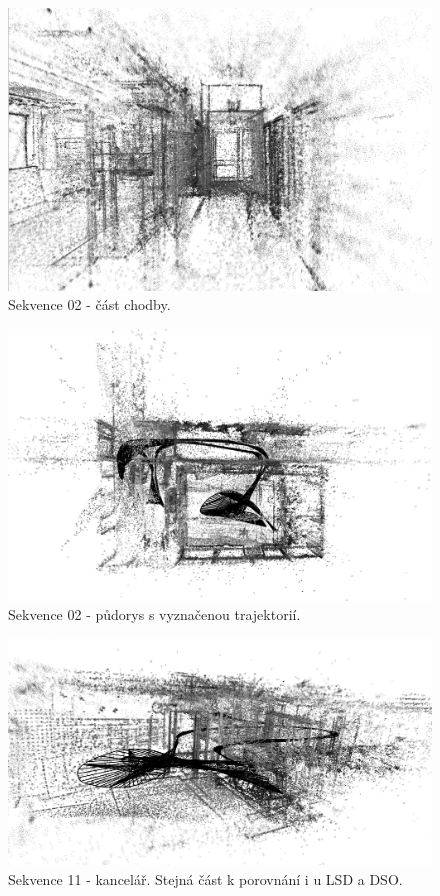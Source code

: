 \documentclass[12pt,a4paper]{report}
\begin{document}
\begin{figure}[H]
\centering
\includegraphics[width=1\textwidth]{img/LDSO_02_chodba.png}
\caption{Sekvence 02 - část chodby.}
\label{28}
\end{figure}

\begin{figure}[H]
\centering
\includegraphics[width=1\textwidth]{img/LDSO_02_top_b.png}
\caption{Sekvence 02 - půdorys s vyznačenou trajektorií.}
\label{29}
\end{figure}

\begin{figure}[H]
\centering
\includegraphics[width=1\textwidth]{img/LDSO_kancl_b.png}
\caption{Sekvence 11 - kancelář. Stejná část k porovnání i u LSD a DSO.}
\label{30}
\end{figure}
\end{document}
